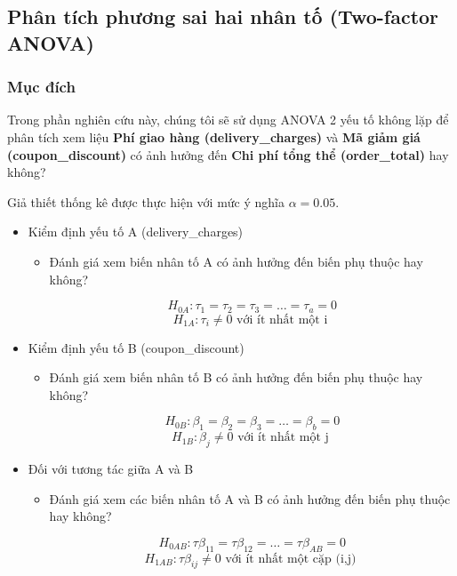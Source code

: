 
\subsection{Phân tích phương sai hai nhân tố (Two-factor ANOVA)}
\subsubsection{Mục đích}
Trong phần nghiên cứu này, chúng tôi sẽ sử dụng ANOVA 2 yếu tố không lặp để phân tích xem liệu \textbf{Phí giao hàng (delivery\_charges)} và \textbf{Mã giảm giá  (coupon\_discount)} có ảnh hưởng đến \textbf{Chi phí tổng thể (order\_total)} hay không?

Giả thiết thống kê được thực hiện với mức ý nghĩa $\alpha = 0.05$.


\begin{itemize}
    
    \item Kiểm định yếu tố A (delivery\_charges)
    \begin{itemize}
        \item Đánh giá xem biến nhân tố A có ảnh hưởng đến biến phụ thuộc hay không?
        
        \[
            H_{0A}: \tau_{1} = \tau_{2} = \tau_{3} = \dots = \tau_{a} = 0
            \]
            \[
            H_{1A}: \tau_{i} \neq  0 \text{ với ít nhất một i }
            \]
    \end{itemize}
    
    \item Kiểm định yếu tố B (coupon\_discount)
    \begin{itemize}
        \item Đánh giá xem biến nhân tố B có ảnh hưởng đến biến phụ thuộc hay không?
        
        \[
            H_{0B}: \beta_{1} = \beta_{2} = \beta_{3} = \dots = \beta_{b} = 0
            \]
            \[
            H_{1B}: \beta_{j} \neq  0 \text{ với ít nhất một j }
            \]
    \end{itemize}
    \item Đối với tương tác giữa A và B  
    \begin{itemize}
        \item Đánh giá xem các biến nhân tố A và B có ảnh hưởng đến biến phụ thuộc hay không?
        
        \[
            H_{0AB}: \tau\beta_{11} = \tau\beta_{12}  = \dots = \tau\beta_{AB} = 0 
            \]
            \[
            H_{1AB}: \tau\beta_{ij} \neq  0 \text{ với ít nhất một cặp (i,j) }
            \]
    \end{itemize}
\end{itemize}
